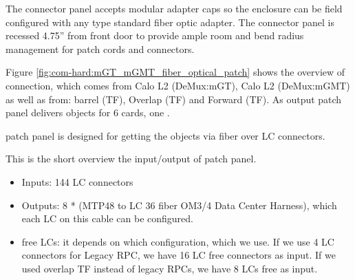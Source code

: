 The connector panel accepts modular adapter caps so the enclosure can be field configured with any
type standard fiber optic adapter. The connector panel is recessed 4.75” from front door to provide ample
room and bend radius management for patch cords and connectors. 


Figure \ref{fig:com-hard:mGT_mGMT_fiber_optical_patch} shows the overview of connection, which comes from Calo L2 (DeMux:mGT), Calo L2 (DeMux:mGMT) as well as from: barrel (TF), Overlap (TF) and Forward (TF). 
As output patch panel delivers objects for 6 \ugt cards, one \ugmt. 

\ugt patch panel is designed for getting the objects via fiber over LC connectors. 

This is the short overview the input/output of patch panel.

\begin{itemize}
\item Inputs: 144 LC connectors
\item Outputs: 8 * (MTP48 to LC 36 fiber OM3/4 Data Center Harness), which each LC on this cable can be configured. 
\item free LCs: it depends on which configuration, which we use. If we use 4 LC connectors for Legacy RPC, we have 16 LC free connectors as input. If we used
overlap TF instead of legacy RPCs, we have 8 LCs free as input. 
\end{itemize}


